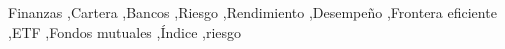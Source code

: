 \documentclass[a4paper,fleqn]{cas-sc}
\newtheorem{theorem}{Theorem}
\newtheorem{lemma}[theorem]{Lemma}
\begin{document}
\begin{keywords}
    Finanzas \sep Cartera \sep Bancos \sep Riesgo \sep Rendimiento \sep Desempeño \sep Frontera eficiente \sep ETF \sep Fondos mutuales \sep Índice \sep riesgo
\end{keywords}

\maketitle







\end{document}
